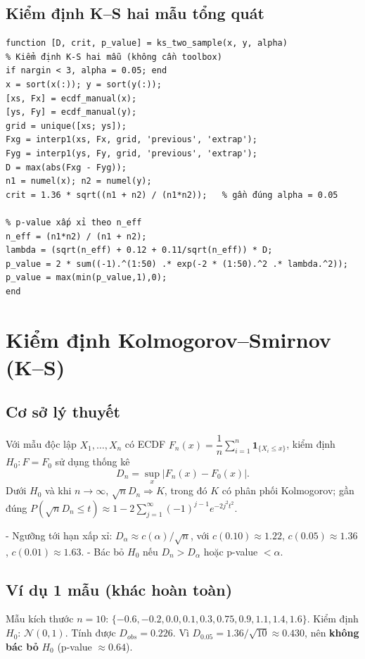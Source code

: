 \subsection{Kiểm định K--S hai mẫu tổng quát}
\begin{matlab}
\begin{lstlisting}
function [D, crit, p_value] = ks_two_sample(x, y, alpha)
% Kiểm định K-S hai mẫu (không cần toolbox)
if nargin < 3, alpha = 0.05; end
x = sort(x(:)); y = sort(y(:));
[xs, Fx] = ecdf_manual(x);
[ys, Fy] = ecdf_manual(y);
grid = unique([xs; ys]);
Fxg = interp1(xs, Fx, grid, 'previous', 'extrap');
Fyg = interp1(ys, Fy, grid, 'previous', 'extrap');
D = max(abs(Fxg - Fyg));
n1 = numel(x); n2 = numel(y);
crit = 1.36 * sqrt((n1 + n2) / (n1*n2));   % gần đúng alpha = 0.05

% p-value xấp xỉ theo n_eff
n_eff = (n1*n2) / (n1 + n2);
lambda = (sqrt(n_eff) + 0.12 + 0.11/sqrt(n_eff)) * D;
p_value = 2 * sum((-1).^(1:50) .* exp(-2 * (1:50).^2 .* lambda.^2));
p_value = max(min(p_value,1),0);
end
\end{lstlisting}
\end{matlab}

\section{Kiểm định Kolmogorov--Smirnov (K--S)}

\subsection{Cơ sở lý thuyết}
\begin{dn}
Với mẫu độc lập $X_1,\ldots,X_n$ có ECDF $F_n(x)=\dfrac{1}{n}\sum_{i=1}^n \mathbf{1}_{\{X_i\le x\}}$, kiểm định $H_0:F=F_0$ sử dụng thống kê
\[ D_n=\sup_x |F_n(x)-F_0(x)|. \]
Dưới $H_0$ và khi $n\to\infty$, $\sqrt{n}D_n\Rightarrow K$, trong đó $K$ có phân phối Kolmogorov; gần đúng $P(\sqrt{n}D_n\le t)\approx1-2\sum_{j=1}^{\infty}(-1)^{j-1}e^{-2j^2 t^2}$.
\end{dn}

\begin{tinhchat}
- Ngưỡng tới hạn xấp xỉ: $D_{\alpha}\approx c(\alpha)/\sqrt{n}$, với $c(0.10)\approx1.22$, $c(0.05)\approx1.36$, $c(0.01)\approx1.63$.
- Bác bỏ $H_0$ nếu $D_n>D_{\alpha}$ hoặc p-value $<\alpha$.
\end{tinhchat}

\subsection{Ví dụ 1 mẫu (khác hoàn toàn)}
Mẫu kích thước $n=10$: $\{-0.6,-0.2,0.0,0.1,0.3,0.75,0.9,1.1,1.4,1.6\}$. Kiểm định $H_0$: $\mathcal{N}(0,1)$. Tính được $D_{obs}=0.226$. Vì $D_{0.05}=1.36/\sqrt{10}\approx0.430$, nên \textbf{không bác bỏ} $H_0$ (p-value $\approx0.64$).

